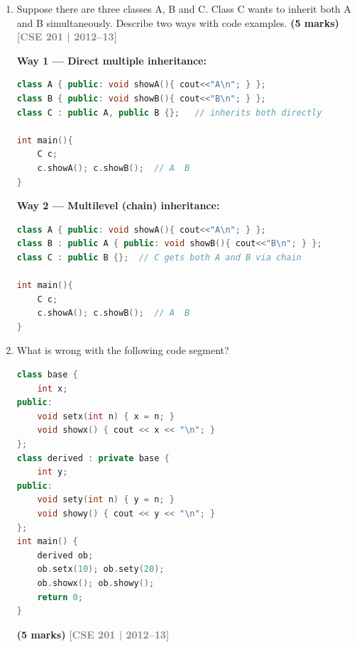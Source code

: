\documentclass[12pt,a3paper]{article}
\newcommand{\yr}[1]{\hfill\textcolor{gray}{\small\textbf{[#1]}}}
\newcommand{\mk}[1]{\textcolor{orange!70!black}{\small\textbf{(#1 marks)}}}
\begin{document}
\begin{enumerate}
\begin{tcolorbox}
\begin{lstlisting}[language=C++]
int main(){
    media* arr[] = {
        new book("C++ Primer","Pearson",900),
        new tape("Data Structures","MIT",60.0)
    };
    for(auto m: arr){ m->show(); m->read(); delete m; }
    return 0;
}
\end{lstlisting}

\end{tcolorbox}


\item Suppose there are three classes A, B and C. Class C wants to inherit both A and B simultaneously. Describe two ways with code examples. \mk{5}
\yr{CSE 201 | 2012--13}
\begin{tcolorbox}[enhanced,breakable,ansbox,colback=cG!4,colframe=cG,
  boxrule=0.8pt,arc=5pt,
  title={\textbf{Answer --- Two ways for class C to inherit both A and B}},
  fonttitle=\bfseries\color{white},colbacktitle=cG]

\textbf{Way 1 --- Direct multiple inheritance:}

\begin{lstlisting}[language=C++]
class A { public: void showA(){ cout<<"A\n"; } };
class B { public: void showB(){ cout<<"B\n"; } };
class C : public A, public B {};   // inherits both directly

int main(){
    C c;
    c.showA(); c.showB();  // A  B
}
\end{lstlisting}

\textbf{Way 2 --- Multilevel (chain) inheritance:}

\begin{lstlisting}[language=C++]
class A { public: void showA(){ cout<<"A\n"; } };
class B : public A { public: void showB(){ cout<<"B\n"; } };
class C : public B {};  // C gets both A and B via chain

int main(){
    C c;
    c.showA(); c.showB();  // A  B
}
\end{lstlisting}

\end{tcolorbox}


\item What is wrong with the following code segment?
\begin{lstlisting}[language=C++]
class base {
    int x;
public:
    void setx(int n) { x = n; }
    void showx() { cout << x << "\n"; }
};
class derived : private base {
    int y;
public:
    void sety(int n) { y = n; }
    void showy() { cout << y << "\n"; }
};
int main() {
    derived ob;
    ob.setx(10); ob.sety(20);
    ob.showx(); ob.showy();
    return 0;
}
\end{lstlisting}
\mk{5}
\yr{CSE 201 | 2012--13}
\begin{tcolorbox}[enhanced,breakable,ansbox,colback=cG!4,colframe=cG,
  boxrule=0.8pt,arc=5pt,
  title={\textbf{Answer --- Problem in private inheritance code}},
  fonttitle=\bfseries\color{white},colbacktitle=cG]


\end{tcolorbox}
\end{enumerate}
\end{document}
